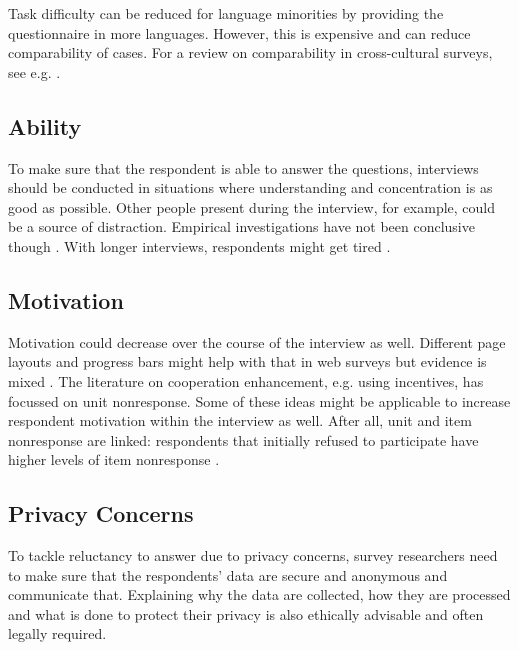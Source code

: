 \documentclass[a4paper,12pt]{article}
\begin{document}
Task difficulty can be reduced for language minorities by providing the questionnaire in more languages. However, this is expensive and can reduce comparability of cases. For a review on comparability in cross-cultural surveys, see e.g. \citet{behrTranslationMeasurementInstruments2016}.

\subsection{Ability}

To make sure that the respondent is able to answer the questions, interviews should be conducted in situations where understanding and concentration is as good as possible. Other people present during the interview, for example, could be a source of distraction. Empirical investigations have not been conclusive though \citep{kupekDeterminantsItemNonresponse1998, tuSocialDistanceRespondent2007, silberEffectsQuestionRespondent2021}. With longer interviews, respondents might get tired \citep{holbrookInterviewerErrorsHelp2016, olsonEffectsRespondentQuestion2019}.

\subsection{Motivation}

Motivation could decrease over the course of the interview as well. Different page layouts and progress bars might help with that in web surveys but evidence is mixed \citep{peytchevWebSurveyDesign2006, yanShouldStayShould2011, sarrafSurveyPageLength2014}. The
literature on cooperation enhancement, e.g. using incentives, has focussed on unit nonresponse. Some of these ideas might be applicable to increase respondent motivation within the interview as well. After all, unit and item nonresponse are linked: respondents that initially refused to participate have higher levels of item nonresponse \citep{yanRelationUnitNonresponse2010, frickerExaminingRelationshipNonresponse2010}.

\subsection{Privacy Concerns}

To tackle reluctancy to answer due to privacy concerns, survey researchers need to make sure that the respondents' data are secure and anonymous and communicate that. Explaining why the data are collected, how they are processed and what is done to protect their privacy is also ethically advisable and often legally required.
\end{document}
